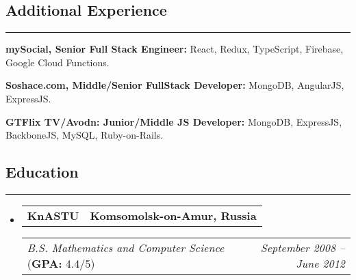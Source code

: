 \documentclass[11pt,letterpaper]{article}
\makeatletter
\newcommand{\headerrow}[2]
{\begin{tabular*}{\linewidth}{l@{\extracolsep{\fill}}r}
#1 &
#2 \\
\end{tabular*}}
\makeatother
\begin{document}
\renewcommand\labelitemi{$\bullet$}


\subsection*{\Large Additional Experience}
\vspace{-.5em}
\hrule
\vspace{1em}
\begin{itemize*}
	\item \textbf{mySocial, Senior Full Stack Engineer:} React, Redux, TypeScript, Firebase, Google Cloud Functions.
	\item \textbf{Soshace.com, Middle/Senior FullStack Developer:} MongoDB, AngularJS, ExpressJS.
	\item \textbf{GTFlix TV/Avodn: Junior/Middle JS Developer:} MongoDB, ExpressJS, BackboneJS, MySQL, Ruby-on-Rails.
\end{itemize*}

\subsection*{\Large Education}
\vspace{-.5em}
\hrule
\vspace{1em}

\begin{itemize}[leftmargin=1em]
	\parskip=0.1em
		
	\item
	      \headerrow
	      {\textbf{KnASTU}}
	      {\textbf{Komsomolsk-on-Amur, Russia}}
	      \headerrow
	      {\emph{B.S. Mathematics and Computer Science} (\textbf{GPA:} 4.4/5)}
	      {\emph{September 2008 -- June 2012}}
	      	      
\end{itemize}
\end{document}
